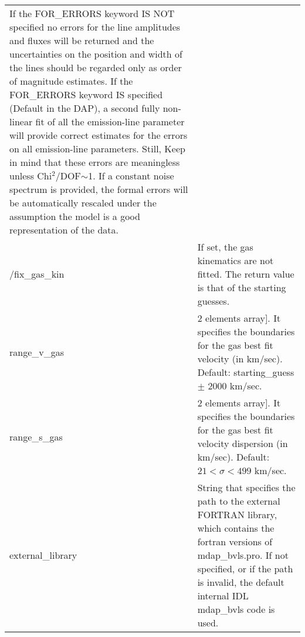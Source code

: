 \begin{center}
\begin{longtable}{p{2.7cm}| p{11.1cm}}
       If the FOR\_ERRORS keyword IS NOT specified no errors for the
       line amplitudes and fluxes will be returned and the
       uncertainties on the position and width of the lines should be
       regarded only as order of magnitude estimates.  If the
       FOR\_ERRORS keyword IS specified (Default in the DAP), a second
       fully non-linear fit of all the emission-line parameter will
       provide correct estimates for the errors on all emission-line
       parameters.  Still, Keep in mind that these errors are
       meaningless unless Chi$^2$/DOF$\sim$1. If a constant noise
       spectrum is provided, the formal errors will be automatically
       rescaled under the assumption the model is a good
       representation of the data.\\
%
/fix\_gas\_kin &  If set, the gas kinematics are not fitted. The 
                   return value is that of the starting guesses.\\ 
%
range\_v\_gas & 2 elements array]. It specifies the boundaries for the gas best 
           fit velocity (in km/sec). Default: starting\_guess $\pm$ 2000 km/sec.\\
%
range\_s\_gas &  2 elements array]. It specifies the boundaries for the gas best fit 
             velocity dispersion (in km/sec). Default: $21 < \sigma < 499$ km/sec.\\
%
external\_library & String that specifies the path to the external FORTRAN library, 
                   which contains the fortran versions of mdap\_bvls.pro. If not 
                   specified, or if the path is invalid, the default internal IDL 
                   mdap\_bvls code is used. \\
\hline
\hline
\end{longtable}
\end{center}
